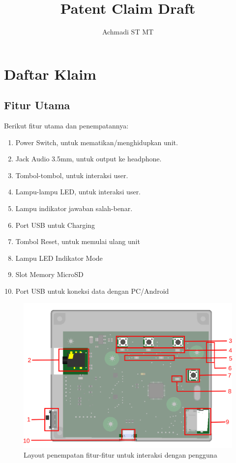 \documentclass[12pt,]{article}
\title{\Large \bf
	Patent Claim Draft\\
}
\author{Achmadi ST MT}
\date{}
\begin{document}
	\maketitle
	\thispagestyle{empty}
	
	\newpage
	\section{Daftar Klaim}
	
	\subsection{Fitur Utama}
	
	Berikut fitur utama dan penempatannya:
	\begin{enumerate}
		\item Power Switch, untuk mematikan/menghidupkan unit.
		\item Jack Audio 3.5mm, untuk output ke headphone.
		\item Tombol-tombol, untuk interaksi user.
		\item Lampu-lampu LED, untuk interaksi user.
		\item Lampu indikator jawaban salah-benar.
		\item Port USB untuk Charging
		\item Tombol Reset, untuk memulai ulang unit
		\item Lampu LED Indikator Mode
		\item Slot Memory MicroSD
		\item Port USB untuk koneksi data dengan PC/Android
	\end{enumerate}

	\begin{figure}[!ht]
		\centering
		\includegraphics[width=400pt]{images/fig_1_part}
		\caption{Layout penempatan fitur-fitur untuk interaksi dengan pengguna}
	\end{figure}
\end{document}
